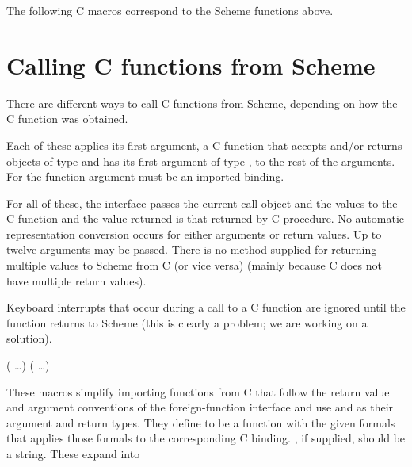 The following C macros correspond to the Scheme functions above.

\begin{protos}
\end{protos}

\section{Calling C functions from Scheme}
\label{sec:external-call}

There are different ways to call C functions from Scheme, depending on
 how the C function was obtained.

\begin{protos}
\end{protos}
\noindent
Each of these applies its first argument, a C function that accepts
and/or returns objects of type  and has its first
argument of type , to the rest of the arguments.
For  the function argument must be an
imported binding.

For all of these, the interface passes the current call object and
 the  values to the C function and the value returned is
 that returned by C procedure.
No automatic representation conversion occurs for either arguments or
 return values.
Up to twelve arguments may be passed.
There is no method supplied for returning multiple values to
 Scheme from C (or vice versa) (mainly because C does not have multiple return
 values).

Keyboard interrupts that occur during a call to a C function are ignored
 until the function returns to Scheme (this is clearly a
 problem; we are working on a solution).

\begin{protos}
{  ( \ldots)}
{  ( \ldots)\ }
\end{protos}
\noindent{}These macros simplify importing functions from C that
 follow the return value and argument conventions of the
 foreign-function interface and use  and
  as their argument and return types.
They define  to be a function with the given formals that
 applies those formals to the corresponding C binding.
, if supplied, should be a string.
These expand into

